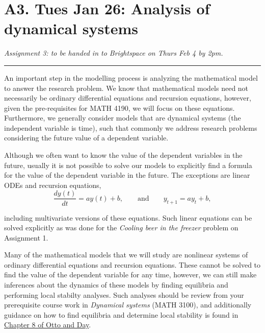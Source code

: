 \documentclass[]{book}
\begin{document}
\chapter{A3. Tues Jan 26: Analysis of dynamical
systems}\label{a3.-tues-jan-26-analysis-of-dynamical-systems}

\emph{Assignment 3: to be handed in to Brightspace on Thurs Feb 4 by
2pm.}

\begin{center}\rule{0.5\linewidth}{0.5pt}\end{center}

An important step in the modelling process is analyzing the mathematical
model to answer the research problem. We know that mathematical models
need not necessarily be ordinary differential equations and recursion
equations, however, given the pre-requisites for MATH 4190, we will
focus on these equations. Furthermore, we generally consider models that
are dynamical systems (the independent variable is time), such that
commonly we address research problems considering the future value of a
dependent variable.

Although we often want to know the value of the dependent variables in
the future, usually it is not possible to solve our models to explicitly
find a formula for the value of the dependent variable in the future.
The exceptions are linear ODEs and recursion equations,\\

\begin{equation}
\frac{dy(t)}{dt} = a y(t) + b, \qquad \mbox{and} \qquad y_{t+1} = a y_t + b,
\end{equation}

including multivariate versions of these equations. Such linear
equations can be solved explicitly as was done for the \emph{Cooling
beer in the freezer} problem on Assignment 1.

Many of the mathematical models that we will study are nonlinear systems
of ordinary differential equations and recursion equations. These cannot
be solved to find the value of the dependent variable for any time,
however, we can still make inferences about the dynamics of these models
by finding equilibria and performing local stabilty analyses. Such
analyses should be review from your prerequisite course work in
\emph{Dynamical systems} (MATH 3100), and additionally guidance on how
to find equilibria and determine local stability is found in
\href{https://ebookcentral-proquest-com.qe2a-proxy.mun.ca/lib/mun/reader.action?docID=768551\&ppg=326}{Chapter
8 of Otto and Day}.
\end{document}
